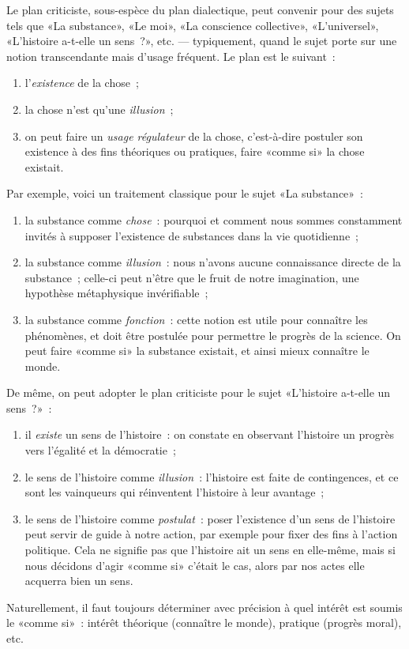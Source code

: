 \documentclass[a4paper,11pt]{article}
\newcommand{\cad}{c'est-à-dire}
\begin{document}
Le plan criticiste, sous-espèce du plan dialectique, peut convenir pour
des sujets tels que «La substance», «Le moi», «La conscience
collective», «L'universel», «L'histoire a-t-elle un sens~?», etc. ---
typiquement, quand le sujet porte sur une notion transcendante mais
d'usage fréquent. Le plan est le suivant~:
\begin{enumerate}
\item l'\emph{existence} de la chose~;
\item la chose n'est qu'une \emph{illusion}~;
\item on peut faire un \emph{usage régulateur} de la chose, \cad{}
  postuler son existence à des fins théoriques ou pratiques, faire
  «comme si» la chose existait.
\end{enumerate}
Par exemple, voici un traitement classique pour le sujet «La
substance»~:
\begin{enumerate}
\item la substance comme \emph{chose}~: pourquoi et comment nous sommes
  constamment invités à supposer l'existence de substances dans la vie
  quotidienne~;
\item la substance comme \emph{illusion}~: nous n'avons aucune
  connaissance directe de la substance~; celle-ci peut n'être que le
  fruit de notre imagination, une hypothèse métaphysique invérifiable~;
\item la substance comme \emph{fonction}~: cette notion est utile pour
  connaître les phénomènes, et doit être postulée pour permettre le
  progrès de la science. On peut faire «comme si» la substance existait,
  et ainsi mieux connaître le monde.
\end{enumerate}
De même, on peut adopter le plan criticiste pour le sujet «L'histoire
a-t-elle un sens~?»~:
\begin{enumerate}
\item il \emph{existe} un sens de l'histoire~: on constate en observant
  l'histoire un progrès vers l'égalité et la démocratie~;
\item le sens de l'histoire comme \emph{illusion}~: l'histoire est faite
  de contingences, et ce sont les vainqueurs qui réinventent l'histoire
  à leur avantage~;
\item le sens de l'histoire comme \emph{postulat}~: poser l'existence
  d'un sens de l'histoire peut servir de guide à notre action, par
  exemple pour fixer des fins à l'action politique. Cela ne signifie pas
  que l'histoire ait un sens en elle-même, mais si nous décidons d'agir
  «comme si» c'était le cas, alors par nos actes elle acquerra bien un
  sens.
\end{enumerate}
Naturellement, il faut toujours déterminer avec précision à quel intérêt
est soumis le «comme si»~: intérêt théorique (connaître le monde),
pratique (progrès moral), etc.
\end{document}
